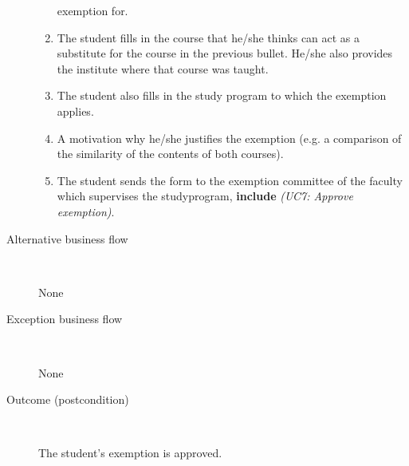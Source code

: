 \begin{description}
\begin{enumerate}
	  	exemption for. 
	  	\item The student fills in the course that he/she thinks can act as a
	  	substitute for the course in the previous bullet. He/she also provides the
	  	institute where that course was taught.
	  	\item The student also fills in the study program to which the exemption
	  	applies.
	  	\item A motivation why he/she justifies the exemption (e.g. a comparison of
	  	the similarity of the contents of both courses).
	  	\item The student sends the form to the exemption committee of the faculty
	  	which supervises the studyprogram, \textbf{include} \emph{(UC7: Approve
	  	exemption)}.
	\end{enumerate}
	\item[Alternative business flow] \ 
		\par None
	\item[Exception business flow] \
		\par None
	\item[Outcome (postcondition)] \ 
		\par The student's exemption is approved.
\end{description}